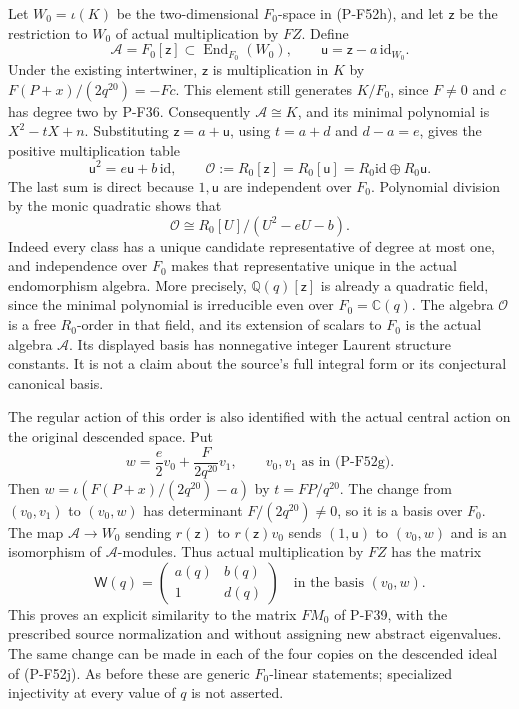 \documentclass[11pt,a4paper]{article}
\begin{document}
Let $W_0=\iota(K)$ be the two-dimensional $F_0$-space in
(P-F52h), and let $\mathsf z$ be the restriction to $W_0$
of actual multiplication by $FZ$. Define
\[
 \mathcal A=F_0[\mathsf z]\subset\operatorname{End}_{F_0}(W_0),
 \qquad \mathsf u=\mathsf z-a\,\mathrm{id}_{W_0}.
                                                               \tag{P-F52ab}
\]
Under the existing intertwiner, $\mathsf z$ is multiplication
in $K$ by $F(P+x)/(2q^{20})=-Fc$. This element still generates
$K/F_0$, since $F\ne0$ and $c$ has degree two by P-F36.
Consequently $\mathcal A\cong K$, and its minimal polynomial
is $X^2-tX+n$. Substituting $\mathsf z=a+\mathsf u$,
using $t=a+d$ and $d-a=e$, gives the positive multiplication
table
\[
       \mathsf u^2=e\mathsf u+b\,\mathrm{id},\qquad
 \mathcal O:=R_0[\mathsf z]=R_0[\mathsf u]
       =R_0\mathrm{id}\oplus R_0\mathsf u.
                                                               \tag{P-F52ac}
\]
The last sum is direct because $1,\mathsf u$ are independent
over $F_0$. Polynomial division by the monic quadratic shows
that
\[
           \mathcal O\cong R_0[U]/(U^2-eU-b).
\]
Indeed every class has a unique candidate representative of
degree at most one, and independence over $F_0$ makes that
representative unique in the actual endomorphism algebra.
More precisely, $\mathbb Q(q)[\mathsf z]$ is already a
quadratic field, since the minimal polynomial is irreducible
even over $F_0=\mathbb C(q)$. The algebra $\mathcal O$ is a
free $R_0$-order in that field, and its extension of scalars
to $F_0$ is the actual algebra $\mathcal A$.
Its displayed basis has nonnegative integer Laurent structure constants.
It is not a claim about the source's full integral form or
its conjectural canonical basis.

The regular action of this order is also identified with the
actual central action on the original descended space. Put
\[
       w=\frac{e}{2}v_0+\frac{F}{2q^{20}}v_1,
       \qquad v_0,v_1\text{ as in (P-F52g)}.
                                                               \tag{P-F52ad}
\]
Then $w=\iota(F(P+x)/(2q^{20})-a)$ by $t=FP/q^{20}$.
The change from $(v_0,v_1)$ to $(v_0,w)$ has determinant
$F/(2q^{20})\ne0$, so it is a basis over $F_0$.
The map $\mathcal A\to W_0$ sending
$r(\mathsf z)$ to $r(\mathsf z)v_0$ sends $(1,\mathsf u)$
to $(v_0,w)$ and is an isomorphism of $\mathcal A$-modules.
Thus actual multiplication by $FZ$ has the matrix
\[
             \mathsf W(q)=
                 \begin{pmatrix}a(q)&b(q)\\1&d(q)\end{pmatrix}
                    \quad\text{in the basis }(v_0,w).
                                                               \tag{P-F52ae}
\]
This proves an explicit similarity to the matrix $FM_0$ of
P-F39, with the prescribed source normalization and without
assigning new abstract eigenvalues. The same change can be
made in each of the four copies on the descended ideal of
(P-F52j). As before these are generic $F_0$-linear statements;
specialized injectivity at every value of $q$ is not asserted.
\end{document}
